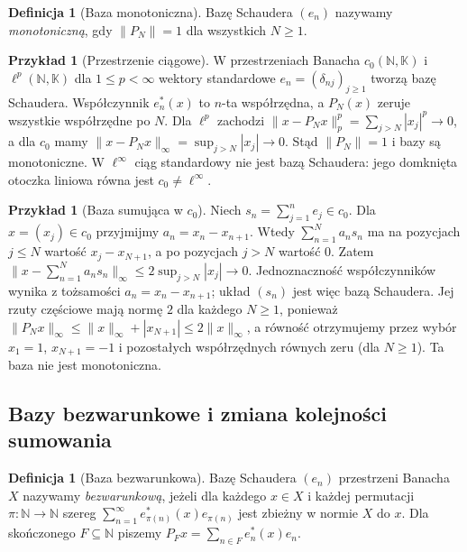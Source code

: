 \documentclass[11pt,a4paper]{article}
\numberwithin{equation}{section}
\theoremstyle{plain}
\theoremstyle{definition}
\newtheorem{definicja}[twierdzenie]{Definicja}
\newtheorem{przyklad}[twierdzenie]{Przykład}
\theoremstyle{remark}
\newcommand{\N}{\mathbb N}
\newcommand{\K}{\mathbb K}
\begin{document}
\begin{definicja}[Baza monotoniczna]
\label{def:monotonic27}
Bazę Schaudera $(e_n)$ nazywamy \emph{monotoniczną}, gdy
$\|P_N\|=1$ dla wszystkich $N\ge1$.
\end{definicja}

\begin{przyklad}[Przestrzenie ciągowe]
\label{ex:sequence-bases27}
W przestrzeniach Banacha $c_0(\N,\K)$ i $\ell^p(\N,\K)$
dla $1\le p<\infty$ wektory standardowe
$e_n=(\delta_{nj})_{j\ge1}$ tworzą bazę Schaudera.
Współczynnik $e_n^*(x)$ to $n$-ta współrzędna,
a $P_N(x)$ zeruje wszystkie współrzędne po $N$.
Dla $\ell^p$ zachodzi
$\|x-P_Nx\|_p^p=\sum_{j>N}|x_j|^p\to0$,
a dla $c_0$ mamy $\|x-P_Nx\|_\infty=\sup_{j>N}|x_j|\to0$.
Stąd $\|P_N\|=1$ i bazy są monotoniczne.
W $\ell^\infty$ ciąg standardowy nie jest bazą Schaudera:
jego domknięta otoczka liniowa równa jest $c_0\ne\ell^\infty$.
\end{przyklad}

\begin{przyklad}[Baza sumująca w $c_0$]
\label{ex:summing-basis27}
Niech $s_n=\sum_{j=1}^ne_j\in c_0$.
Dla $x=(x_j)\in c_0$ przyjmijmy $a_n=x_n-x_{n+1}$.
Wtedy $\sum_{n=1}^Na_ns_n$ ma na pozycjach $j\le N$
wartość $x_j-x_{N+1}$, a po pozycjach $j>N$ wartość $0$.
Zatem
$\|x-\sum_{n=1}^Na_ns_n\|_\infty
\le2\sup_{j>N}|x_j|\to0$.
Jednoznaczność współczynników wynika z tożsamości
$a_n=x_n-x_{n+1}$; układ $(s_n)$ jest więc bazą Schaudera.
Jej rzuty częściowe mają normę $2$ dla każdego $N\ge1$,
ponieważ $\|P_Nx\|_\infty
\le\|x\|_\infty+|x_{N+1}|\le2\|x\|_\infty$,
a równość otrzymujemy przez wybór $x_1=1$, $x_{N+1}=-1$
i pozostałych współrzędnych równych zeru (dla $N\ge1$).
Ta baza nie jest monotoniczna.
\end{przyklad}

\subsection{Bazy bezwarunkowe i zmiana kolejności sumowania}

\begin{definicja}[Baza bezwarunkowa]
\label{def:unconditional27}
Bazę Schaudera $(e_n)$ przestrzeni Banacha $X$ nazywamy
\emph{bezwarunkową}, jeżeli dla każdego $x\in X$ i każdej
permutacji $\pi:\N\to\N$ szereg
$\sum_{n=1}^\infty e_{\pi(n)}^*(x)e_{\pi(n)}$
jest zbieżny w normie $X$ do $x$.
Dla skończonego $F\subseteq\N$ piszemy
$P_Fx=\sum_{n\in F}e_n^*(x)e_n$.
\end{definicja}
\end{document}
